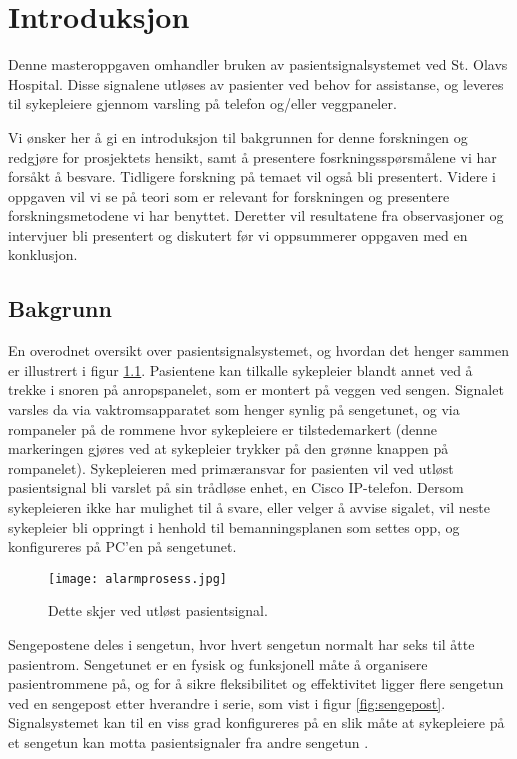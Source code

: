 \chapter{Introduksjon}
\label{chp:introduksjon}

Denne masteroppgaven omhandler bruken av pasientsignalsystemet ved St. Olavs Hospital. Disse signalene utløses av pasienter ved behov for assistanse, og leveres til sykepleiere gjennom varsling på telefon og/eller veggpaneler. 

\noindent
Vi ønsker her å gi en introduksjon til bakgrunnen for denne forskningen og redgjøre for prosjektets hensikt, samt å presentere fosrkningsspørsmålene vi har forsåkt å besvare. Tidligere forskning på temaet vil også bli presentert. Videre i oppgaven vil vi se på teori som er relevant for forskningen og presentere forskningsmetodene vi har benyttet. Deretter vil resultatene fra observasjoner og intervjuer bli presentert og diskutert før vi oppsummerer oppgaven med en konklusjon.

\section{Bakgrunn}
En overodnet oversikt over pasientsignalsystemet, og hvordan det henger sammen er illustrert i figur \ref{fig:detteskjer}. Pasientene kan tilkalle sykepleier blandt annet ved å trekke i snoren på anropspanelet, som er montert på veggen ved sengen. Signalet varsles da via vaktromsapparatet som henger synlig på sengetunet, og via rompaneler på de rommene hvor sykepleiere er tilstedemarkert (denne markeringen gjøres ved at sykepleier trykker på den grønne knappen på rompanelet). 
Sykepleieren med primæransvar for pasienten vil ved utløst pasientsignal bli varslet på sin trådløse enhet, en Cisco IP-telefon. Dersom sykepleieren ikke har mulighet til å svare, eller velger å avvise sigalet, vil neste sykepleier bli oppringt i henhold til bemanningsplanen som settes opp, og konfigureres på PC'en på sengetunet.

\begin{figure}[H]
\centering
\texttt{[image: alarmprosess.jpg]}
\caption{Dette skjer ved utløst pasientsignal.}
\label{fig:detteskjer}
\end{figure}

\noindent
Sengepostene deles i sengetun, hvor hvert sengetun normalt har seks til åtte pasientrom. Sengetunet er en fysisk og funksjonell måte å organisere pasientrommene på, og for å sikre fleksibilitet og effektivitet ligger flere sengetun ved en sengepost etter hverandre i serie, som vist i figur \ref{fig:sengepost}. Signalsystemet kan til en viss grad konfigureres på en slik måte at sykepleiere på et sengetun kan motta pasientsignaler fra andre sengetun \citep{Aslaksen}.


